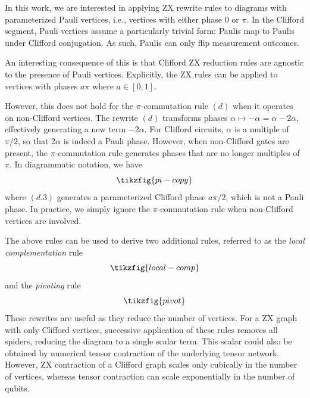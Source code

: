 \documentclass[
  a4paper,
  onecolumn,
  11pt,
  allowtoday
]{quantumarticle}
\begin{document}
In this work, we are interested in applying ZX rewrite rules to diagrams with parameterized Pauli vertices, i.e., vertices with either phase $0$ or $\pi$. In the Clifford segment, Pauli vertices assume a particularly trivial form: Paulis map to Paulis under Clifford conjugation. As such, Paulis can only flip measurement
outcomes.

An interesting consequence of this
is that Clifford ZX reduction rules are agnostic to the presence of Pauli vertices. Explicitly, the ZX rules can be applied to vertices
with phases $a\pi$ where $a\in[0,1]$.

However, this does not hold for the
$\pi$-commutation rule $(d)$ when it operates on non-Clifford vertices. The rewrite $(d)$ transforms phases $\alpha \mapsto -\alpha = \alpha - 2\alpha$, effectively generating a new term $-2\alpha$. For Clifford circuits, $\alpha$ is a multiple of $\pi/2$, so that $2\alpha$ is indeed a Pauli phase. However, when non-Clifford gates are present, the $\pi$-commutation rule generates phases that are no longer multiples of $\pi$. In diagrammatic notation, we have
\begin{equation*}
  \tikzfig{pi-copy}
  \label{eqn:pi_copy}
\end{equation*}
where $(d.3)$ generates a parameterized Clifford phase $a\pi/2$, which is not a Pauli phase. In practice, we simply ignore the $\pi$-commutation rule when non-Clifford vertices are involved.

The above rules can be used to derive two additional rules, referred to as the \emph{local complementation} rule
\begin{equation}
  \tikzfig{local-comp}
  \label{eqn:local_comp}
\end{equation}
and the \emph{pivoting} rule
\begin{equation}
  \tikzfig{pivot}
  \label{eqn:pivoting}
\end{equation}
These rewrites are useful as they reduce the number of vertices.
For a ZX graph with only Clifford vertices, successive application of these rules removes all spiders, reducing the diagram to a single scalar term.
This scalar could also be obtained by numerical tensor contraction of the underlying tensor network.
However, ZX contraction of a Clifford graph scales only cubically in the number of vertices, whereas tensor contraction can scale exponentially in the number of qubits.
\end{document}
